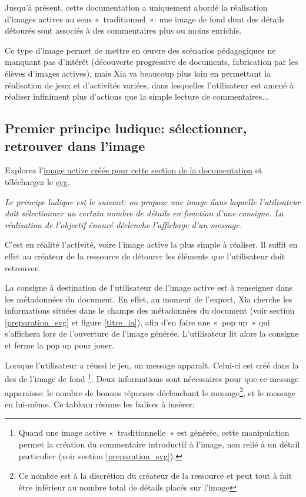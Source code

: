 {Jusqu'à présent, cette documentation a uniquement abordé la réalisation d'images actives au sens «~traditionnel~»:
une image de fond dont des détails détourés sont associés à des commentaires plus ou moins enrichis.

Ce type d'image permet de mettre en œuvre des scénarios pédagogiques ne manquant pas d'intérêt 
(découverte progressive de documents, fabrication par les élèves d'images actives), 
mais Xia va beaucoup plus loin en permettant la réalisation de jeux et d'activités variées, dans lesquelles
l'utilisateur est amené à réaliser infiniment plus d'actions que la simple lecture
 de commentaires...

\subsection{Premier principe ludique: sélectionner, retrouver dans l'image}

Explorez l'\href{http://geoffrey-gekiere.ac-versailles.fr/xia3}{image active créée pour cette section de la documentation} 
et téléchargez le \href{http://geoffrey-gekiere.ac-versailles.fr/xia3/svg/xia3.svg}{svg}.

\textit{Le principe ludique est le suivant: on propose une image dans laquelle l'utilisateur 
doit sélectionner un certain nombre de détails en fonction d'une consigne. 
La réalisation de l'objectif énoncé déclenche l'affichage d'un message.}

C'est en réalité l'activité, voire l'image active la plus simple à réaliser. Il suffit en effet 
au créateur de la ressource de détourer les éléments que l'utilisateur doit retrouver.

La consigne à destination de l'utilisateur de l'image active est à renseigner 
dans les métadonnées du document. En effet, au moment de l'export, Xia cherche les informations
situées dans le champs  des métadonnées du document 
(voir section \ref{preparation_svg} et figure \ref{titre_ia}), afin d'en faire une «~pop up~»
qui s'affichera lors de l'ouverture de l'image générée. L'utilisateur lit alors la consigne et ferme
la pop up pour jouer.

Lorsque l'utilisateur a réussi le jeu, un message apparaît. 
Celui-ci est créé dans la  des  de l'image de fond
\footnote{Quand une image active «~traditionnelle~» est générée, cette manipulation
permet la création du commentaire introductif à l'image, non relié à un détail particulier
(voir section \ref{preparation_svg}).}. 
Deux informations sont nécessaires pour que ce message apparaisse:
le nombre de bonnes réponses déclenchant le message\footnote{Ce nombre est à la discrétion
du créateur de la ressource et peut tout à fait être inférieur au nombre total de détails placés sur l'image},
et le message en lui-même. Ce tableau résume les balises à insérer:

}
